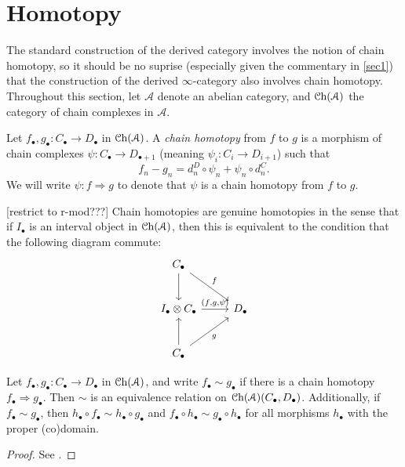 \section{Homotopy}\label{sec2}

The standard construction of the derived category involves the notion of chain homotopy, so it should be no suprise (especially given the commentary in \cref{sec1}) that the construction of the derived $\infty $-category also involves chain homotopy. Throughout this section, let $\mathcal{A} $ denote an abelian category, and $\mathcal{C}\mathrm{h}(\mathcal{A} ) $ the category of chain complexes in $\mathcal{A} $.

\begin{definition}\label{2.1}
	Let $f_{\bullet} ,g_{\bullet} : C_{\bullet}  \to D_{\bullet} $ in $\mathcal{C}\mathrm{h}(\mathcal{A} ) $. A \emph{chain homotopy} from $f$ to $g$ is a morphism of chain complexes $\psi : C_{\bullet}  \to D_{\bullet+1} $ (meaning $\psi _i : C_i \to D_{i+1} $) such that
	\[
		f_n-g_n=d_n^D\circ \psi _n + \psi _n\circ d_n^C
	.\]
	We will write $\psi : f \Rightarrow g$ to denote that $\psi $ is a chain homotopy from $f$ to $g$.
\end{definition}

\begin{remark}\label{2.2}
	[restrict to r-mod???] Chain homotopies are genuine homotopies in the sense that if $I_{\bullet} $ is an interval object in $\mathcal{C}\mathrm{h}(\mathcal{A} ) $, then this is equivalent to the condition that the following diagram commute:
	\[\begin{tikzcd}[row sep = 2.5em, column sep = 2.5em]
	C_{\bullet} \ar[d] \ar[" f ", dr]  &  \\
	I_{\bullet} \otimes C_{\bullet} \ar[" (f\text{,} g\text{,} \psi ) ", r]  & D_{\bullet}  \\
	C_{\bullet} \ar[u] \ar[" g "', ur]  & 
	\end{tikzcd}\]
\end{remark}

\begin{proposition}\label{2.3}
	Let $f_{\bullet} ,g_{\bullet} : C_{\bullet}  \to D_{\bullet} $ in $\mathcal{C}\mathrm{h}(\mathcal{A} ) $, and write $f_{\bullet} \sim g_{\bullet} $ if there is a chain homotopy $f_{\bullet} \Rightarrow g_{\bullet} $. Then $\sim $ is an equivalence relation on $\mathcal{C}\mathrm{h}(\mathcal{A} ) (C_{\bullet} ,D_{\bullet} )$. Additionally, if $f_{\bullet} \sim g_{\bullet} $, then $h_{\bullet} \circ f_{\bullet} \sim h_{\bullet} \circ g_{\bullet} $ and $f_{\bullet} \circ  h_{\bullet} \sim g_{\bullet} \circ h_{\bullet} $ for all morphisms $h_{\bullet} $ with the proper (co)domain.
\end{proposition}
\begin{proof}
	See \cite{wei}.
\end{proof}

